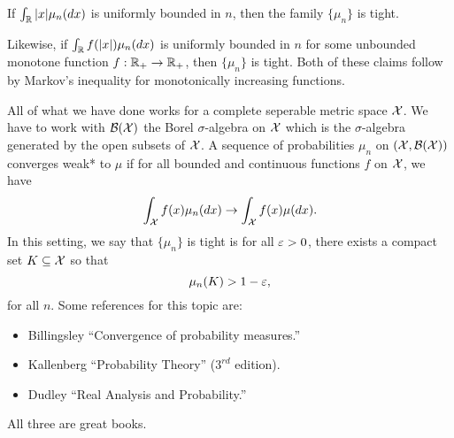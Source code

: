 \begin{remark}
    If $\int_{\mathbb R} {\left\lvert x\right\rvert}\mu_n(dx)$ is uniformly bounded in $n$, then the family $\{\mu_n\}$ is tight.
    
    Likewise, if $\int_{\mathbb R} f({\left\lvert x\right\rvert})\mu_n(dx)$ is uniformly bounded in $n$ for some unbounded monotone function $f:{\mathbb R}_+ \to {\mathbb R}_+$, then $\{\mu_n\}$ is tight. Both of these claims follow by Markov's inequality for monotonically increasing functions.
\end{remark}
\begin{remark}
    All of what we have done works for a complete seperable metric space ${\mathcal{X}}$. We have to work with ${\mathcal{B}}({\mathcal{X}})$ the Borel $\sigma$-algebra on ${\mathcal{X}}$ which is the $\sigma$-algebra generated by the open subsets of ${\mathcal{X}}$. A sequence of probabilities $\mu_n$ on $({\mathcal{X}},{\mathcal{B}}({\mathcal{X}}))$ converges weak* to $\mu$ if for all bounded and continuous functions $f$ on ${\mathcal{X}}$, we have 
    \[\int_{\mathcal{X}} f(x)\mu_n(dx)\to \int_{\mathcal{X}} f(x)\mu(dx). \]
    In this setting, we say that $\{\mu_n\}$ is tight is for all $\varepsilon > 0$, there exists a compact set $K \subseteq {\mathcal{X}}$ so that 
    \[\mu_n(K) > 1-\varepsilon,\]
    for all $n$. Some references for this topic are:
    \begin{itemize}
        \item Billingsley ``Convergence of probability measures.''
        \item Kallenberg ``Probability Theory'' ($3^{rd}$ edition).
        \item Dudley ``Real Analysis and Probability.''
    \end{itemize}
    All three are great books.
\end{remark}
